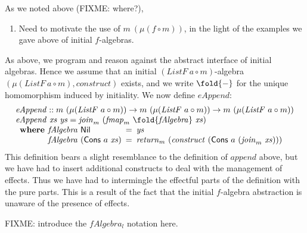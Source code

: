 
As we noted above (FIXME: where?), 
\begin{enumerate}
\item Need to motivate the use of $m~(\mu(f \circ m))$, in the light
  of the examples we gave above of initial $f$-algebras.
\end{enumerate}

As above, we program and reason against the abstract interface of
initial algebras. Hence we assume that an initial $(\mathit{ListF}~a
\circ m)$-algebra $(\mu(\mathit{ListF}~a \circ m),
\mathit{construct})$ exists, and we write $\fold{-}$ for the unique
homomorphism induced by initiality. We now define $\mathit{eAppend}$:
\begin{displaymath}
  \begin{array}{l}
    \mathit{eAppend} :: m~(\mu (\mathit{ListF}~a \circ m)) \to m~(\mu (\mathit{ListF}~a \circ m)) \to m~(\mu (\mathit{ListF}~a \circ m)) \\
    \mathit{eAppend}~\mathit{xs}~\mathit{ys} = \mathit{join}_m~(\mathit{fmap}_m~\fold{\mathit{fAlgebra}}~\mathit{xs}) \\
    \begin{array}{r@{\hspace{0.4em}}l@{\hspace{0.5em}}c@{\hspace{0.5em}}l}
      \textbf{where} & \mathit{fAlgebra}~\mathsf{Nil} &=& \mathit{ys} \\
                     & \mathit{fAlgebra}~(\mathsf{Cons}~a~\mathit{xs}) &=& \mathit{return}_m~(\mathit{construct}~(\mathsf{Cons}~a~(\mathit{join}_m~\mathit{xs})))
    \end{array}
  \end{array}
\end{displaymath}
This definition bears a slight resemblance to the definition of
$\mathit{append}$ above, but we have had to insert additional
constructs to deal with the management of effects. Thus we have had to
intermingle the effectful parts of the definition with the pure
parts. This is a result of the fact that the initial $f$-algebra
abstraction is unaware of the presence of effects.

FIXME: introduce the $\mathit{fAlgebra_l}$ notation here.


